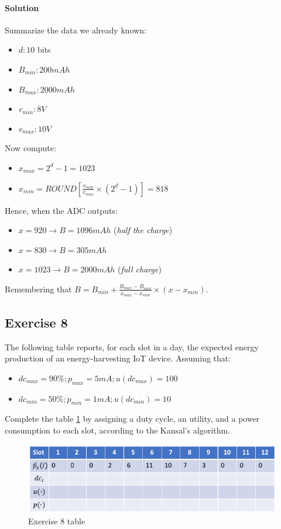\paragraph{Solution}\label{sec:solution}
Summarize the data we already known:
\begin{itemize}
	\item 
	$d: 10$ bits
	\item 
	$B_{min}: 200mAh$
	\item 
	$B_{max}: 2000mAh$
	\item 
	$v_{min}: 8V$
	\item 
	$v_{max}: 10V$
\end{itemize}
Now compute:
\begin{itemize}
	\item 
	$x_{max} = 2^{d}-1 = 1023$
	\item 
	$x_{min} = ROUND [\frac{v_{min}}{v_{max}}\times (2^{d}-1)]=818$
\end{itemize}
Hence, when the ADC outputs:
\begin{itemize}
	\item 
	$x =920 \rightarrow B = 1096 mAh$ (\textit{half the charge})
	\item 
	$x = 830  \rightarrow B = 305 mAh$
	\item 
	$x = 1023  \rightarrow B = 2000mAh$ (\textit{full charge})
	
\end{itemize}
Remembering that $B = B_{min}+\frac{B_{max}-B_{min}}{x_{max}-x_{min}} \times (x-x_{min})$.


\subsection{Exercise 8}
The following table reports, for each slot in a day, the expected
energy production of an energy-harvesting IoT device.
Assuming that:
\begin{itemize}
	\item $dc_{max} = 90\%; p_{max} = 5mA; u(dc_{max}) = 100$
	\item $dc_{min} = 50\%; p_{min} = 1mA; u(dc_{min}) = 10$
\end{itemize}

Complete the table \ref{e7-table} by assigning a duty cycle, an utility, and a power
consumption to each slot, according to the Kansal’s algorithm.

\begin{figure}[h]
	\centering\includegraphics[scale=0.50]{images/Pasted image 20230601095844.png}
	\caption{Exercise 8 table}
	\label{e7-table}
\end{figure}



